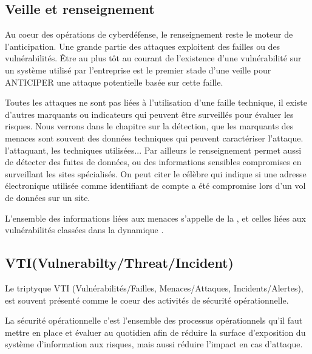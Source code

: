 \subsection{Veille et renseignement}

Au coeur des opérations de cyberdéfense, le renseignement reste le moteur de l'anticipation.  Une grande partie des attaques exploitent des failles ou des vulnérabilités. Être au plus tôt au courant de l'existence d'une vulnérabilité sur un système utilisé par l'entreprise est le premier stade d'une veille pour ANTICIPER une attaque potentielle basée sur cette faille.

Toutes les attaques ne sont pas liées à l'utilisation d'une faille technique, il existe d'autres marquants ou indicateurs qui peuvent être surveillés pour évaluer les risques. Nous verrons dans le chapitre sur la détection, que les marquants des menaces sont souvent des données techniques qui peuvent caractériser l'attaque. l'attaquant, les techniques utilisées...
Par ailleurs le renseignement permet aussi de détecter des fuites de données, ou des informations sensibles compromises en surveillant les sites spécialisés.
On peut citer le célèbre \textbf{} qui indique si une adresse électronique utilisée comme identifiant de compte a été compromise lors d'un vol de données sur un site. 

L'ensemble des informations liées aux menaces s'appelle de la , et celles liées aux vulnérabilités  classées dans la dynamique .


\subsection{VTI(Vulnerabilty/Threat/Incident)}


Le triptyque VTI (Vulnérabilités/Failles, Menaces/Attaques, Incidents/Alertes), est souvent présenté comme le coeur des activités de sécurité opérationnelle. 


La sécurité opérationnelle c’est l’ensemble des processus opérationnels qu’il faut mettre en place et évaluer au quotidien afin de réduire la surface d’exposition du système d’information aux risques, mais aussi réduire l'impact en cas d'attaque. 

